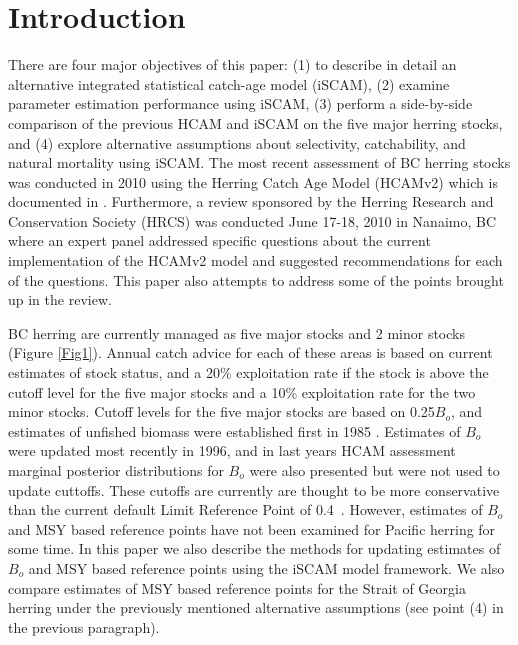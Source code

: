 

\section{Introduction}
	
There are four major objectives of this paper: (1) to describe in detail an alternative integrated statistical catch-age model (iSCAM), (2) examine parameter estimation performance using iSCAM, (3) perform a side-by-side comparison of the previous HCAM and iSCAM on the five major herring stocks, and (4) explore alternative assumptions about selectivity, catchability, and natural mortality using iSCAM.  The most recent assessment of BC herring stocks was conducted in 2010 using the Herring Catch Age Model (HCAMv2) which is documented in \cite{Clear2010}.  Furthermore, a review sponsored by the Herring Research and Conservation Society (HRCS) was conducted June 17-18, 2010 in Nanaimo, BC where an expert panel addressed specific questions about the current implementation of the HCAMv2 model and suggested recommendations for each of the questions.  This paper also attempts to address some of the points brought up in the review.

BC herring are currently managed as five major stocks and 2 minor stocks (Figure \ref{Fig1}).  Annual catch advice for each of these areas is based on current estimates of stock status, and a 20\% exploitation rate if the stock is above the cutoff level for the five major stocks and a 10\% exploitation rate for the two minor stocks.  Cutoff levels for the five major stocks are based on 0.25$B_o$, and estimates of unfished biomass were established first in 1985 \citep{haist1986stock}.  Estimates of $B_o$ were updated most recently in 1996, and in last years HCAM assessment marginal posterior distributions for $B_o$ were also presented but were not used to update cuttoffs.  These cutoffs are currently are thought to be more conservative 	than the current default Limit Reference Point of 0.4\bmsy\ \citep{dfo2006}. However, estimates of $B_o$ and MSY based reference points have not been examined for Pacific herring for some time.  In this paper we also describe the methods for updating estimates of $B_o$ and MSY based reference points using the iSCAM model framework.  We also compare estimates of MSY based reference points for the Strait of Georgia herring under the previously mentioned alternative assumptions (see point (4) in the previous paragraph).

